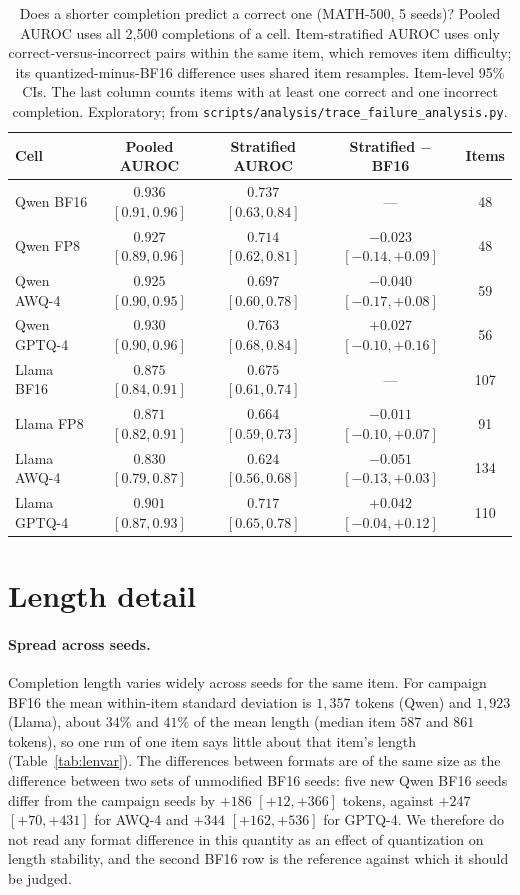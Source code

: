 \documentclass[11pt,a4paper]{article}
\begin{document}
\begin{table}[!htbp]
\centering
\caption{Does a shorter completion predict a correct one (MATH-500, 5 seeds)? Pooled AUROC uses all 2{,}500 completions of a cell. Item-stratified AUROC uses only correct-versus-incorrect pairs within the same item, which removes item difficulty; its quantized-minus-BF16 difference uses shared item resamples. Item-level 95\% CIs. The last column counts items with at least one correct and one incorrect completion. Exploratory; from \texttt{scripts/analysis/trace\_failure\_analysis.py}.}
\label{tab:auroc}
\footnotesize
\setlength{\tabcolsep}{3pt}
\begin{tabular}{lcccc}
\toprule
\textbf{Cell} & \textbf{Pooled AUROC} & \textbf{Stratified AUROC} & \textbf{Stratified $-$ BF16} & \textbf{Items} \\
\midrule
Qwen BF16 & $0.936$ $[0.91,0.96]$ & $0.737$ $[0.63,0.84]$ & --- & 48 \\
Qwen FP8 & $0.927$ $[0.89,0.96]$ & $0.714$ $[0.62,0.81]$ & $-0.023$ $[-0.14,+0.09]$ & 48 \\
Qwen AWQ-4 & $0.925$ $[0.90,0.95]$ & $0.697$ $[0.60,0.78]$ & $-0.040$ $[-0.17,+0.08]$ & 59 \\
Qwen GPTQ-4 & $0.930$ $[0.90,0.96]$ & $0.763$ $[0.68,0.84]$ & $+0.027$ $[-0.10,+0.16]$ & 56 \\
\midrule
Llama BF16 & $0.875$ $[0.84,0.91]$ & $0.675$ $[0.61,0.74]$ & --- & 107 \\
Llama FP8 & $0.871$ $[0.82,0.91]$ & $0.664$ $[0.59,0.73]$ & $-0.011$ $[-0.10,+0.07]$ & 91 \\
Llama AWQ-4 & $0.830$ $[0.79,0.87]$ & $0.624$ $[0.56,0.68]$ & $-0.051$ $[-0.13,+0.03]$ & 134 \\
Llama GPTQ-4 & $0.901$ $[0.87,0.93]$ & $0.717$ $[0.65,0.78]$ & $+0.042$ $[-0.04,+0.12]$ & 110 \\
\bottomrule
\end{tabular}
\end{table}

\FloatBarrier
\section{Length detail}
\paragraph{Spread across seeds.} Completion length varies widely across seeds for the same item. For campaign BF16 the mean within-item standard deviation is $1{,}357$ tokens (Qwen) and $1{,}923$ (Llama), about $34\%$ and $41\%$ of the mean length (median item $587$ and $861$ tokens), so one run of one item says little about that item's length (Table~\ref{tab:lenvar}). The differences between formats are of the same size as the difference between two sets of unmodified BF16 seeds: five new Qwen BF16 seeds differ from the campaign seeds by $+186$ $[+12,+366]$ tokens, against $+247$ $[+70,+431]$ for AWQ-4 and $+344$ $[+162,+536]$ for GPTQ-4. We therefore do not read any format difference in this quantity as an effect of quantization on length stability, and the second BF16 row is the reference against which it should be judged.
\end{document}
